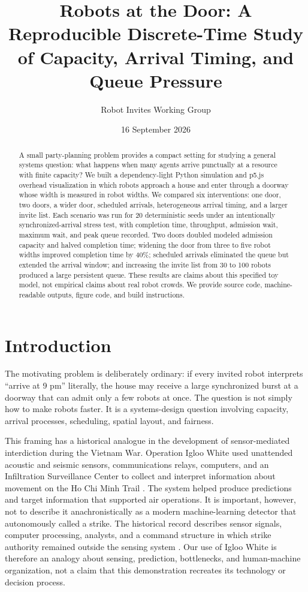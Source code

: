 \documentclass[11pt]{article}
\title{Robots at the Door: A Reproducible Discrete-Time Study of Capacity, Arrival Timing, and Queue Pressure}
\author{Robot Invites Working Group}
\date{16 September 2026}
\begin{document}
\maketitle

\begin{abstract}
A small party-planning problem provides a compact setting for studying a general systems question: what happens when many agents arrive punctually at a resource with finite capacity? We built a dependency-light Python simulation and p5.js overhead visualization in which robots approach a house and enter through a doorway whose width is measured in robot widths. We compared six interventions: one door, two doors, a wider door, scheduled arrivals, heterogeneous arrival timing, and a larger invite list. Each scenario was run for 20 deterministic seeds under an intentionally synchronized-arrival stress test, with completion time, throughput, admission wait, maximum wait, and peak queue recorded. Two doors doubled modeled admission capacity and halved completion time; widening the door from three to five robot widths improved completion time by 40\%; scheduled arrivals eliminated the queue but extended the arrival window; and increasing the invite list from 30 to 100 robots produced a large persistent queue. These results are claims about this specified toy model, not empirical claims about real robot crowds. We provide source code, machine-readable outputs, figure code, and build instructions.
\end{abstract}

\section{Introduction}
The motivating problem is deliberately ordinary: if every invited robot interprets ``arrive at 9 pm'' literally, the house may receive a large synchronized burst at a doorway that can admit only a few robots at once. The question is not simply how to make robots faster. It is a systems-design question involving capacity, arrival processes, scheduling, spatial layout, and fairness.

This framing has a historical analogue in the development of sensor-mediated interdiction during the Vietnam War. Operation Igloo White used unattended acoustic and seismic sensors, communications relays, computers, and an Infiltration Surveillance Center to collect and interpret information about movement on the Ho Chi Minh Trail \cite{vanstaaveren1993,nalty2005}. The system helped produce predictions and target information that supported air operations. It is important, however, not to describe it anachronistically as a modern machine-learning detector that autonomously called a strike. The historical record describes sensor signals, computer processing, analysts, and a command structure in which strike authority remained outside the sensing system \cite{nalty2005,tilford1991}. Our use of Igloo White is therefore an analogy about sensing, prediction, bottlenecks, and human-machine organization, not a claim that this demonstration recreates its technology or decision process.
\end{document}
